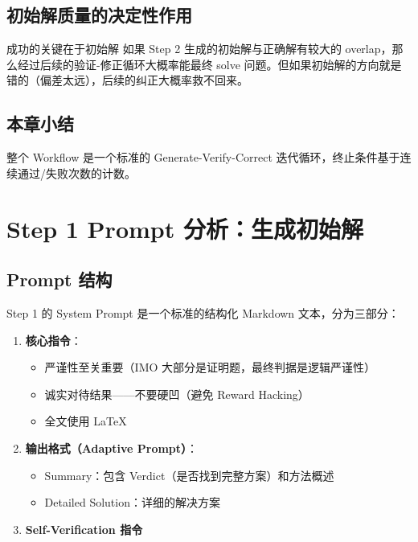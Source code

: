 \documentclass[a4paper]{article}
\begin{document}
\subsection{初始解质量的决定性作用}

\begin{warningbox}{成功的关键在于初始解}
如果 Step 2 生成的初始解与正确解有较大的 overlap，那么经过后续的验证-修正循环大概率能最终 solve 问题。但如果初始解的方向就是错的（偏差太远），后续的纠正大概率救不回来。
\end{warningbox}

\subsection{本章小结}

整个 Workflow 是一个标准的 Generate-Verify-Correct 迭代循环，终止条件基于连续通过/失败次数的计数。

\section{Step 1 Prompt 分析：生成初始解}

\subsection{Prompt 结构}

Step 1 的 System Prompt 是一个标准的结构化 Markdown 文本，分为三部分：

\begin{enumerate}
    \item \textbf{核心指令}：
    \begin{itemize}
        \item 严谨性至关重要（IMO 大部分是证明题，最终判据是逻辑严谨性）
        \item 诚实对待结果——不要硬凹（避免 Reward Hacking）
        \item 全文使用 LaTeX
    \end{itemize}
    \item \textbf{输出格式（Adaptive Prompt）}：
    \begin{itemize}
        \item Summary：包含 Verdict（是否找到完整方案）和方法概述
        \item Detailed Solution：详细的解决方案
    \end{itemize}
    \item \textbf{Self-Verification 指令}
\end{enumerate}
\end{document}
